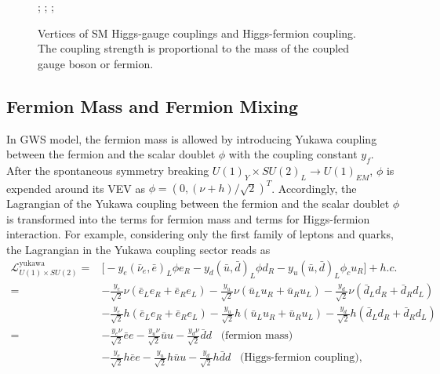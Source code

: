 \begin{figure}[ht]
    \centering
    ; \qquad
    ; \qquad 
    ; \qquad 
    \caption{Vertices of SM Higgs-gauge couplings and Higgs-fermion coupling. The coupling strength is proportional to the mass of the coupled gauge boson or fermion. }
    \label{fig:relatedWorks:qft:ewHiggsGaugeCoupling}
\end{figure}


\subsection{Fermion Mass and Fermion Mixing}

In GWS model, the fermion mass is allowed by introducing Yukawa coupling between the fermion and the scalar doublet $\phi$ with the coupling constant $y_f$. After the spontaneous symmetry breaking $U(1)_Y \times SU(2)_L \to U(1)_{EM}$, $\phi$ is expended around its VEV as $\phi=(0, (\nu+h)/\sqrt{2})^T$. Accordingly, the Lagrangian of the Yukawa coupling between the fermion and the scalar doublet $\phi$ is transformed into the terms for fermion mass and terms for Higgs-fermion interaction. For example, considering only the first family of leptons and quarks, the Lagrangian in the Yukawa coupling sector reads as
\begin{equation}
\begin{split}
	 \mathcal{L}_{U(1)\times SU(2)}^{\text{yukawa}} =& \big[ -y_e (\bar{\nu}_e,\bar{e})_L \phi e_R  -y_d (\bar{u},\bar{d})_L \phi d_R - y_u(\bar{u},\bar{d})_L \phi_c u_R \big ] + h.c. \\
     = & -\frac{y_e}{\sqrt{2}}\nu(\bar{e}_L e_R + \bar{e}_R e_L)   -\frac{y_u}{\sqrt{2}}\nu(\bar{u}_L u_R + \bar{u}_R u_L)  -\frac{y_d}{\sqrt{2}}\nu(\bar{d}_L d_R + \bar{d}_R d_L)  \\
     & -\frac{y_e}{\sqrt{2}}h(\bar{e}_L e_R + \bar{e}_R e_L)  - \frac{y_u}{\sqrt{2}}h(\bar{u}_L u_R + \bar{u}_R u_L)  - \frac{y_d}{\sqrt{2}}h(\bar{d}_L d_R + \bar{d}_R d_L)  \\
     = & -\frac{y_e\nu}{\sqrt{2}}\bar{e} e   -\frac{y_u\nu}{\sqrt{2}}\bar{u}u -\frac{y_d\nu}{\sqrt{2}} \bar{d} d \;\;\; \text{(fermion mass)} \\
     & -\frac{y_e}{\sqrt{2}}h\bar{e} e   -\frac{y_u}{\sqrt{2}}h\bar{u}u -\frac{y_d}{\sqrt{2}} h \bar{d} d \;\;\; \text{(Higgs-fermion coupling)},
\end{split}
\label{eqn:relatedWorks:qft:gws:yukawaLagragian}
\end{equation}


